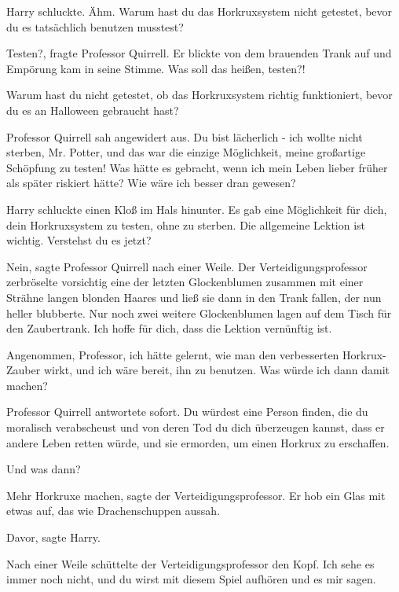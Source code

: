Harry schluckte. \glqq{}Ähm. Warum hast du das Horkruxsystem nicht getestet,
bevor du es tatsächlich benutzen musstest?\grqq{}

\glqq{}Testen?\grqq{}, fragte Professor Quirrell. Er blickte von dem brauenden
Trank auf und Empörung kam in seine Stimme. \glqq{}Was soll das heißen, testen?!\grqq{}

\glqq{}Warum hast du nicht getestet, ob das Horkruxsystem richtig funktioniert,
bevor du es an Halloween gebraucht hast?\grqq{}

Professor Quirrell sah angewidert aus. \glqq{}Du bist lächerlich - ich wollte
nicht sterben, Mr. Potter, und das war die einzige Möglichkeit, meine großartige
Schöpfung zu testen! Was hätte es gebracht, wenn ich mein Leben lieber früher
als später riskiert hätte? Wie wäre ich besser dran gewesen?\grqq{}

Harry schluckte einen Kloß im Hals hinunter. \glqq{}Es gab eine Möglichkeit für
dich, dein Horkruxsystem zu testen, ohne zu sterben. Die allgemeine Lektion ist
wichtig. Verstehst du es jetzt?\grqq{}

\glqq{}Nein\grqq{}, sagte Professor Quirrell nach einer Weile. Der
Verteidigungsprofessor zerbröselte vorsichtig eine der letzten Glockenblumen
zusammen mit einer Strähne langen blonden Haares und ließ sie dann in den Trank
fallen, der nun heller blubberte. Nur noch zwei weitere Glockenblumen lagen auf
dem Tisch für den Zaubertrank. \glqq{}Ich hoffe für dich, dass die Lektion
vernünftig ist.\grqq{}

\glqq{}Angenommen, Professor, ich hätte gelernt, wie man den verbesserten
Horkrux-Zauber wirkt, und ich wäre bereit, ihn zu benutzen. Was würde ich dann
damit machen?\grqq{}

Professor Quirrell antwortete sofort. \glqq{}Du würdest eine Person finden, die
du moralisch verabscheust und von deren Tod du dich überzeugen kannst, dass er
andere Leben retten würde, und sie ermorden, um einen Horkrux zu erschaffen.\grqq{}

\glqq{}Und was dann?\grqq{}

\glqq{}Mehr Horkruxe machen\grqq{}, sagte der Verteidigungsprofessor. Er hob ein
Glas mit etwas auf, das wie Drachenschuppen aussah.

\glqq{}Davor\grqq{}, sagte Harry.

Nach einer Weile schüttelte der Verteidigungsprofessor den Kopf. \glqq{}Ich sehe
es immer noch nicht, und du wirst mit diesem Spiel aufhören und es mir sagen.\grqq{}

